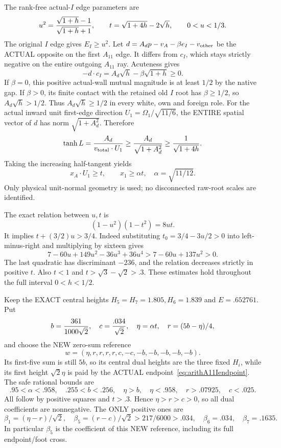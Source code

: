 The rank-free actual-\(I\) edge parameters are
\[
 u^2={\sqrt{1+h}-1\over\sqrt{1+h}+1},\qquad
 t=\sqrt{1+4h}-2\sqrt h,\qquad 0<u<1/3 .
\]
The original \(I\) edge gives \(E_I\ge u^2\).
Let \(d=A_dp-v_A-\beta e_I-v_{\rm other}\)
be the ACTUAL opposite on the first \(A_{11}\)
edge.  It differs from \(c_I\), which stays
strictly negative on the entire outgoing
\(A_{11}\) ray.
Acuteness gives
\[
       -d\cdot c_I=A_d\sqrt h-\beta\sqrt{1+h}\ge0 .
\]
If \(\beta=0\), this positive actual-wall
mutual magnitude is at least \(1/2\)
by the native gap.
If \(\beta>0\), its finite contact with the
retained old \(I\) root has \(\beta\ge1/2\),
so \(A_d\sqrt h>1/2\).
Thus \(A_d\sqrt h\ge1/2\) in every white,
own and foreign role.
For the actual inward unit first-edge direction
\(U_1=\Omega_1/\sqrt{11/6}\), the ENTIRE
spatial vector of \(d\) has norm
\(\sqrt{1+A_d^2}\).
Therefore
\[
 \tanh L={A_d\over v_{\rm total}\cdot U_1}
       \ge {A_d\over\sqrt{1+A_d^2}}
       \ge {1\over\sqrt{1+4h}} .
\]
Taking the increasing half-tangent yields
\[
 x_A\cdot U_1\ge t,\qquad
 x_1\ge\alpha t,\quad\alpha=\sqrt{11/12}.
\tag{A11Iend}\label{eq:arithA11Iendpoint}
\]
Only physical unit-normal geometry is used;
no disconnected raw-root scales are identified.

The exact relation between \(u,t\) is
\[
                    (1-u^2)(1-t^2)=8ut .
\]
It implies \(t+(3/2)u>3/4\).
Indeed substituting \(t_0=3/4-3u/2>0\)
into left-minus-right and multiplying by
sixteen gives
\[
 7-60u+149u^2-36u^3+36u^4
       >7-60u+137u^2>0 .
\]
The last quadratic has discriminant \(-236\),
and the relation decreases strictly in
positive \(t\).
Also \(t<1\) and
\(t>\sqrt3-\sqrt2>.3\).
These estimates hold throughout the full
interval \(0<h<1/2\).

Keep the EXACT central heights
\(H_5=H_7=1.805,H_6=1.839\) and
\(E=.652761\).
Put
\[
 b={361\over1000\sqrt2},\quad
 c={.034\over\sqrt2},\quad
 \eta=\alpha t,\quad r=(5b-\eta)/4,
\]
and choose the NEW zero-sum reference
\[
                  w=(\eta,r,r,r,r,c,-c,-b,-b,-b,-b,-b).
\]
Its first-five sum is still \(5b\), so its
central dual heights are the three fixed
\(H_i\), while its first height
\(\sqrt2\eta\) is paid by the ACTUAL
endpoint~\eqref{eq:arithA11Iendpoint}.
The safe rational bounds are
\[
 .95<\alpha<.958,\quad .255<b<.256,\quad
 \eta>b,\quad\eta<.958,\quad
 r>.07925,\quad c<.025 .
\]
All follow by positive squares and \(t>.3\).
Hence \(\eta>r>c>0\), so all dual coefficients
are nonnegative.  The ONLY positive ones are
\[
 \beta_1=(\eta-r)/\sqrt2,\quad
 \beta_5=(r-c)/\sqrt2>217/6000>.034,\quad
 \beta_6=.034,\quad\beta_7=.1635 .
\]
In particular \(\beta_5\) is the coefficient
of this NEW reference, including its full
endpoint/foot cross.

